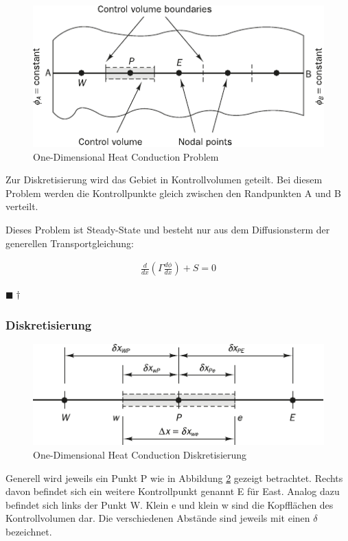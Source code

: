 \documentclass[a4paper]{scrartcl}
\newcommand{\qed}{\begin{flushright}
$\blacksquare \dagger$ \end{flushright}}
\begin{document}
\begin{figure}[h]
\begin{center}
\includegraphics[scale=1]{images/41.pdf}
\caption{One-Dimensional Heat Conduction Problem}
\label{fig:41}
\end{center}
\end{figure}
Zur Diskretisierung wird das Gebiet in Kontrollvolumen geteilt. Bei diesem
Problem werden die Kontrollpunkte gleich zwischen den Randpunkten A und B
verteilt.

 Dieses Problem ist Steady-State und besteht nur aus dem Diffusionsterm der
 generellen Transportgleichung:
 
 \begin{align}
 \frac{d}{dx} \left( \Gamma \frac{d\phi}{dx}\right) + S = 0
 \end{align}
 \qed

\subsubsection{Diskretisierung}


\begin{figure}[h]
\begin{center}
\includegraphics[scale=1.2]{images/42.pdf}
\caption{One-Dimensional Heat Conduction Diskretisierung}
\label{fig:42}
\end{center}
\end{figure}

Generell wird jeweils ein Punkt P wie in Abbildung \ref{fig:42} gezeigt
betrachtet. Rechts davon befindet sich ein weitere Kontrollpunkt genannt E für
East. Analog dazu befindet sich links der Punkt W. Klein e und klein w sind die
Kopfflächen des Kontrollvolumen dar. Die verschiedenen Abstände sind jeweils mit
einen $\delta$ bezeichnet.
\end{document}
